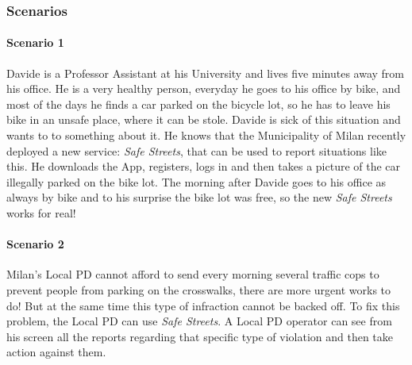 \subsubsection{Scenarios}


\paragraph{Scenario 1}
Davide is a Professor Assistant at his University and lives five minutes away
from his office. He is a very healthy person, everyday he goes to his office by
bike, and most of the days he finds a car parked on the bicycle lot, so he has
to leave his bike in an unsafe place, where it can be stole. Davide is
sick of this situation and wants to to something about it. He knows that the
Municipality of Milan recently deployed a new service: \emph{Safe Streets}, that
can be used to report situations like this. He downloads the App, registers,
logs in and then takes a picture of the car illegally parked on the bike lot.
The morning after Davide goes to his office as always by bike and to his
surprise the bike lot was free, so the new \emph{Safe Streets} works for real!

\paragraph{Scenario 2}
Milan's Local PD cannot afford to send every morning several traffic cops to
prevent people from parking on the crosswalks, there are more urgent works to
do! But at the same time this type of infraction cannot be backed off. To fix
this problem, the Local PD can use \emph{Safe Streets}. A Local PD operator can
see from his screen all the reports regarding that specific type of violation
and then take action against them.